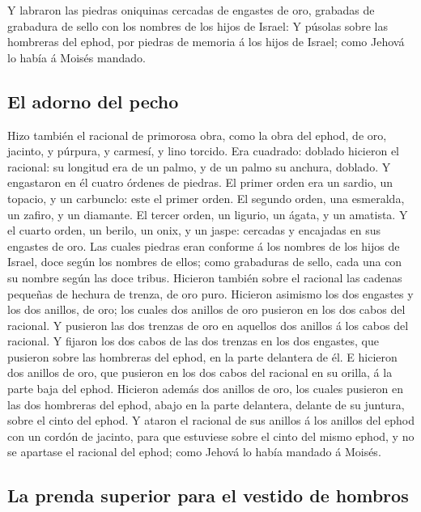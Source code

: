  Y labraron las piedras oniquinas cercadas de engastes de
oro, grabadas de grabadura de sello con los nombres de los hijos de
Israel:  Y púsolas sobre las hombreras del ephod, por
piedras de memoria á los hijos de Israel; como Jehová lo había á Moisés
mandado.

\hypertarget{el-adorno-del-pecho}{%
\subsection{El adorno del pecho}\label{el-adorno-del-pecho}}

 Hizo también el racional de primorosa obra, como la obra
del ephod, de oro, jacinto, y púrpura, y carmesí, y lino torcido.
 Era cuadrado: doblado hicieron el racional: su longitud era
de un palmo, y de un palmo su anchura, doblado.  Y
engastaron en él cuatro órdenes de piedras. El primer orden era un
sardio, un topacio, y un carbunclo: este el primer orden. 
El segundo orden, una esmeralda, un zafiro, y un diamante. 
El tercer orden, un ligurio, un ágata, y un amatista.  Y el
cuarto orden, un berilo, un onix, y un jaspe: cercadas y encajadas en
sus engastes de oro.  Las cuales piedras eran conforme á
los nombres de los hijos de Israel, doce según los nombres de ellos;
como grabaduras de sello, cada una con su nombre según las doce tribus.
 Hicieron también sobre el racional las cadenas pequeñas de
hechura de trenza, de oro puro.  Hicieron asimismo los dos
engastes y los dos anillos, de oro; los cuales dos anillos de oro
pusieron en los dos cabos del racional.  Y pusieron las dos
trenzas de oro en aquellos dos anillos á los cabos del racional.
 Y fijaron los dos cabos de las dos trenzas en los dos
engastes, que pusieron sobre las hombreras del ephod, en la parte
delantera de él.  E hicieron dos anillos de oro, que
pusieron en los dos cabos del racional en su orilla, á la parte baja del
ephod.  Hicieron además dos anillos de oro, los cuales
pusieron en las dos hombreras del ephod, abajo en la parte delantera,
delante de su juntura, sobre el cinto del ephod.  Y ataron
el racional de sus anillos á los anillos del ephod con un cordón de
jacinto, para que estuviese sobre el cinto del mismo ephod, y no se
apartase el racional del ephod; como Jehová lo había mandado á Moisés.

\hypertarget{la-prenda-superior-para-el-vestido-de-hombros-1}{%
\subsection{La prenda superior para el vestido de
hombros}\label{la-prenda-superior-para-el-vestido-de-hombros-1}}

